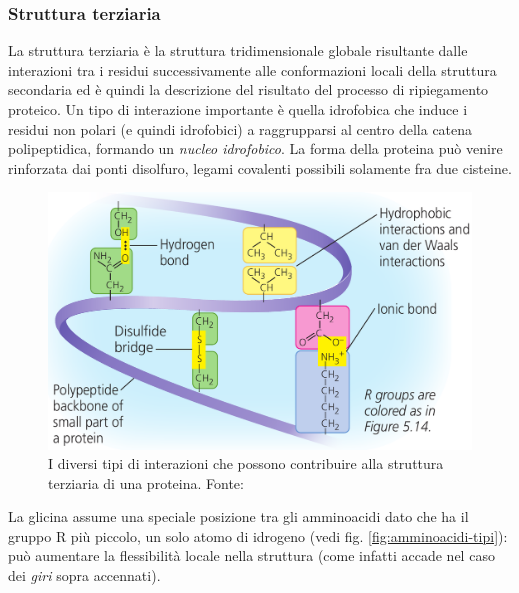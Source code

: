 {{}
\subsubsection{Struttura terziaria}
{
La struttura terziaria è la struttura tridimensionale globale risultante dalle interazioni tra i residui successivamente alle conformazioni locali della struttura secondaria ed è quindi la descrizione del risultato del processo di ripiegamento proteico. Un tipo di interazione importante è quella idrofobica che induce i residui non polari (e quindi idrofobici) a raggrupparsi al centro della catena polipeptidica, formando un \textit{nucleo idrofobico}. La forma della proteina può venire rinforzata dai ponti disolfuro, legami covalenti possibili solamente fra due cisteine.

\begin{figure}[!htp]
	\centering
	\includegraphics[scale=0.35]{images/interazioni-proteine.png}
	\caption{I diversi tipi di interazioni che possono contribuire alla struttura terziaria di una proteina. Fonte: \cite{campbell}}
	\label{fig:interazioni-proteine}
\end{figure}

La glicina assume una speciale posizione tra gli amminoacidi dato che ha il gruppo R più piccolo, un solo atomo di idrogeno (vedi fig. \ref{fig:amminoacidi-tipi}): può aumentare la flessibilità locale nella struttura (come infatti accade nel caso dei \textit{giri} sopra accennati). 

}}
